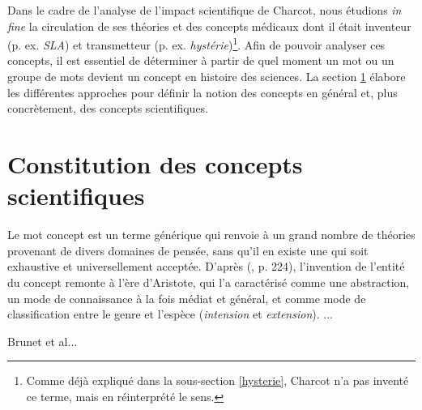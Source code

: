 Dans le cadre de l'analyse de l'impact scientifique de Charcot, nous étudions \textit{in fine} la circulation de ses théories et des concepts médicaux dont il était inventeur (p. ex. \textit{SLA}) et transmetteur (p. ex. \textit{hystérie})\footnote{Comme déjà expliqué dans la sous-section \ref{hysterie}, Charcot n'a pas inventé ce terme, mais en réinterprété le sens.}. Afin de pouvoir analyser ces concepts, il est essentiel de déterminer à partir de quel moment un mot ou un groupe de mots devient un concept en histoire des sciences. La section \ref{concept} élabore les différentes approches pour définir la notion des concepts en général et, plus concrètement, des concepts scientifiques.

\section{Constitution des concepts scientifiques}
\label{concept}

Le mot \og{}concept\fg{} est un terme générique qui renvoie à un grand nombre de théories provenant de divers domaines de pensée, sans qu'il en existe une qui soit exhaustive et universellement acceptée. D'après \citeauthor{Lecourt1999} (\citeyear{Lecourt1999}, p. 224), l'invention de l'entité du concept remonte à l'ère d'Aristote, qui l'a caractérisé comme une abstraction, un mode de connaissance à la fois médiat et général, et comme mode de classification entre le genre et l'espèce (\textit{intension} et \textit{extension}). \citep{schlanger1989concepts} ... 

Brunet et al...


